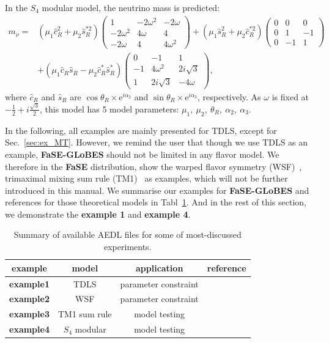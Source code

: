 \documentclass[aps,prd,nofootinbib,preprint]{revtex4}
\begin{document}
{\color{blue}In the $S_4$ modular model, the neutrino mass is predicted:
\begin{eqnarray}\label{eq:S4_mnu}
m_\nu=&(\mu_1\hat{c}_R^2+\mu_2\hat{s}_R^{*2})\left(
\begin{array}{ccc}
1& -2\omega^2& -2\omega\\
-2\omega^2&4\omega&4\\
-2\omega&4&4\omega^2
\end{array}
\right)+
(\mu_1\hat{s}^2_R+\mu_2\hat{c}_R^{*2})\left(
\begin{array}{ccc}
0& 0& 0\\
0&1&-1\\
0&-1&1
\end{array}
\right) \nonumber \\
&+(\mu_1\hat{c}_R\hat{s}_R-\mu_2\hat{c}^*_R\hat{s}_R^*)\left(
\begin{array}{ccc}
0& -1& 1\\
-1&4\omega^2&2i\sqrt{3}\\
1&2i\sqrt{3}&-4\omega
\end{array}
\right),
\end{eqnarray}
where $\hat{c}_R$ and $\hat{s}_R$ are $\cos\theta_R\times \mathrm{e}^{i\alpha_2}$ and $\sin\theta_R\times \mathrm{e}^{i\alpha_3}$, respectively. As $\omega$ is fixed at $-\frac{1}{2}+i\frac{\sqrt{3}}{2}$, this model has 5 model parameters: $\mu_1,~\mu_2,~\theta_R,~\alpha_2,~\alpha_3$.
}

{\color{blue}In the following, all examples are mainly presented for TDLS, except for Sec.~\ref{sec:ex_MT}. However, we remind the user that though we use TDLS as an example, \textbf{FaSE-GLoBES} should not be limited in any flavor model. We therefore in the \textbf{FaSE} distribution, show the warped flavor symmetry (WSF)~\cite{Chen:2015jta}, trimaximal mixing sum rule (TM1)~\cite{Albright:2008rp} as examples, which will not be further introduced in this manual. We summarise our examples for \textbf{FaSE-GLoBES} and references for those theoretical models in Tabl~\ref{tab:examples}. And in the rest of this section, we demonstrate the \textbf{example 1} and \textbf{example 4}. 
}


\begin{table}[h!]
\caption{\label{tab:examples}Summary of available AEDL files for some of most-discussed experiments.}
\centering
\begin{tabular}{c|c|c|c}
example   & model & application & reference \\\hline\hline
\textbf{example1}    &  TDLS  & parameter constraint & \cite{King:2013iva,King:2015dvf,King:2016yvg} \\
\textbf{example2}    &  WSF  & parameter constraint & \cite{Chen:2015jta} \\
\textbf{example3}    &  TM1 sum rule  & model testing & \cite{Albright:2008rp} \\
\textbf{example4}    &  $S_4$ modular  & model testing &\cite{deMedeirosVarzielas:2019cyj}  \\
\end{tabular}
\end{table}
\end{document}
